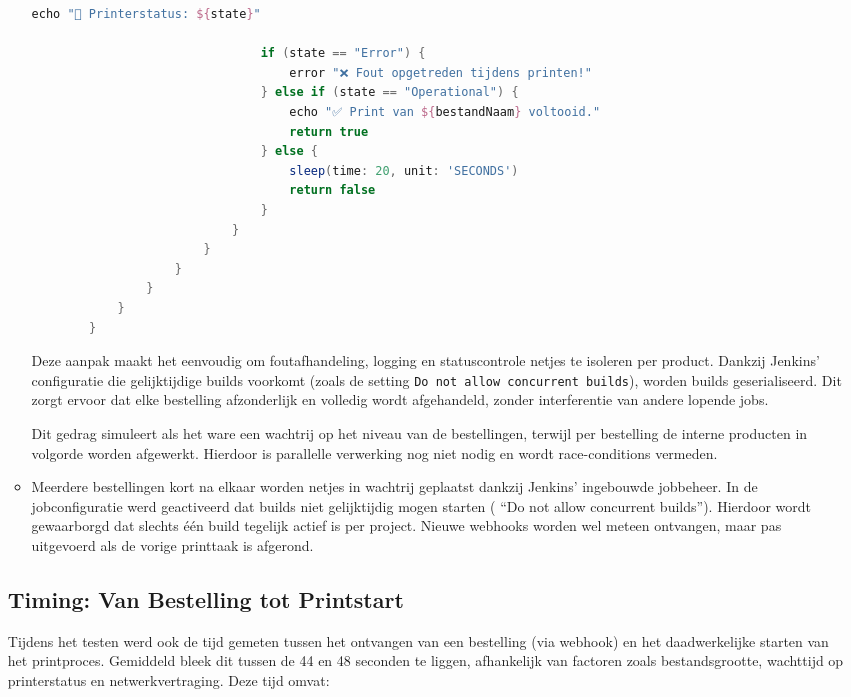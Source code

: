 \begin{enumerate}
\begin{itemize}
\begin{lstlisting}[language=groovy, caption=Sequentiële verwerking per product]
                                echo "📡 Printerstatus: ${state}"
                                
                                if (state == "Error") {
                                    error "❌ Fout opgetreden tijdens printen!"
                                } else if (state == "Operational") {
                                    echo "✅ Print van ${bestandNaam} voltooid."
                                    return true
                                } else {
                                    sleep(time: 20, unit: 'SECONDS')
                                    return false
                                }
                            }
                        }
                    }
                }
            }
        }
    \end{lstlisting}
    
    Deze aanpak maakt het eenvoudig om foutafhandeling, logging en statuscontrole netjes te isoleren per product. Dankzij Jenkins' configuratie die gelijktijdige builds voorkomt (zoals de setting \texttt{Do not allow concurrent builds}), worden builds geserialiseerd. Dit zorgt ervoor dat elke bestelling afzonderlijk en volledig wordt afgehandeld, zonder interferentie van andere lopende jobs.
    
    Dit gedrag simuleert als het ware een wachtrij op het niveau van de bestellingen, terwijl per bestelling de interne producten in volgorde worden afgewerkt. Hierdoor is parallelle verwerking nog niet nodig en wordt race-conditions vermeden.
    
    
    \item Meerdere bestellingen kort na elkaar worden netjes in wachtrij geplaatst dankzij Jenkins' ingebouwde jobbeheer. In de jobconfiguratie werd geactiveerd dat builds niet gelijktijdig mogen starten ( “Do not allow concurrent builds”). Hierdoor wordt gewaarborgd dat slechts één build tegelijk actief is per project. Nieuwe webhooks worden wel meteen ontvangen, maar pas uitgevoerd als de vorige printtaak is afgerond.
\end{itemize}

\subsection{Timing: Van Bestelling tot Printstart}

Tijdens het testen werd ook de tijd gemeten tussen het ontvangen van een bestelling (via webhook) en het daadwerkelijke starten van het printproces. Gemiddeld bleek dit tussen de 44 en 48 seconden te liggen, afhankelijk van factoren zoals bestandsgrootte, wachttijd op printerstatus en netwerkvertraging. Deze tijd omvat:


\end{enumerate}
